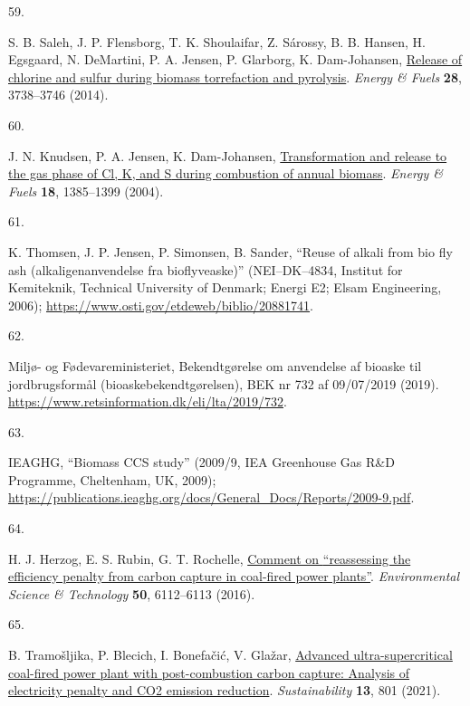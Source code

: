 \documentclass[
  letterpaper,
]{article}
\newlength{\cslhangindent}
\newlength{\csllabelwidth}
\newenvironment{CSLReferences}[2] %
 {\begin{list}{}{%
  \setlength{\itemindent}{0pt}
  \setlength{\leftmargin}{0pt}
  \setlength{\parsep}{0pt}
  \ifodd #1
   \setlength{\leftmargin}{\cslhangindent}
   \setlength{\itemindent}{-1\cslhangindent}
  \fi
  \setlength{\itemsep}{#2\baselineskip}}}
 {\end{list}}
\newcommand{\CSLLeftMargin}[1]{\parbox[t]{\csllabelwidth}{\strut#1\strut}}
\newcommand{\CSLRightInline}[1]{\parbox[t]{\linewidth - \csllabelwidth}{\strut#1\strut}}
\begin{document}
\begin{CSLReferences}{0}{1}
\CSLLeftMargin{59. }%
\CSLRightInline{S. B. Saleh, J. P. Flensborg, T. K. Shoulaifar, Z.
Sárossy, B. B. Hansen, H. Egsgaard, N. DeMartini, P. A. Jensen, P.
Glarborg, K. Dam-Johansen,
\href{https://doi.org/10.1021/ef4021262}{Release of chlorine and sulfur
during biomass torrefaction and pyrolysis}. \emph{Energy \& Fuels}
\textbf{28}, 3738--3746 (2014).}

\CSLLeftMargin{60. }%
\CSLRightInline{J. N. Knudsen, P. A. Jensen, K. Dam-Johansen,
\href{https://doi.org/10.1021/ef049944q}{Transformation and release to
the gas phase of {Cl}, {K}, and {S} during combustion of annual
biomass}. \emph{Energy \& Fuels} \textbf{18}, 1385--1399 (2004).}

\CSLLeftMargin{61. }%
\CSLRightInline{K. Thomsen, J. P. Jensen, P. Simonsen, B. Sander,
{``Reuse of alkali from bio fly ash (alkaligenanvendelse fra
bioflyveaske)''} (NEI--DK--4834, Institut for Kemiteknik, Technical
University of Denmark; Energi E2; Elsam Engineering, 2006);
\url{https://www.osti.gov/etdeweb/biblio/20881741}.}

\CSLLeftMargin{62. }%
\CSLRightInline{Miljø- og Fødevareministeriet, Bekendtg{ø}relse om
anvendelse af bioaske til jordbrugsform{å}l (bioaskebekendtg{ø}relsen),
{BEK} nr 732 af 09/07/2019 (2019).
\url{https://www.retsinformation.dk/eli/lta/2019/732}.}

\CSLLeftMargin{63. }%
\CSLRightInline{IEAGHG, {``Biomass {CCS} study''} (2009/9, IEA
Greenhouse Gas R\&D Programme, Cheltenham, UK, 2009);
\url{https://publications.ieaghg.org/docs/General_Docs/Reports/2009-9.pdf}.}

\CSLLeftMargin{64. }%
\CSLRightInline{H. J. Herzog, E. S. Rubin, G. T. Rochelle,
\href{https://doi.org/10.1021/acs.est.6b00169}{Comment on {``reassessing
the efficiency penalty from carbon capture in coal-fired power
plants''}}. \emph{Environmental Science \& Technology} \textbf{50},
6112--6113 (2016).}

\CSLLeftMargin{65. }%
\CSLRightInline{B. Tramošljika, P. Blecich, I. Bonefačić, V. Glažar,
\href{https://doi.org/10.3390/su13020801}{Advanced ultra-supercritical
coal-fired power plant with post-combustion carbon capture: Analysis of
electricity penalty and {CO2} emission reduction}. \emph{Sustainability}
\textbf{13}, 801 (2021).}


\end{CSLReferences}
\end{document}
